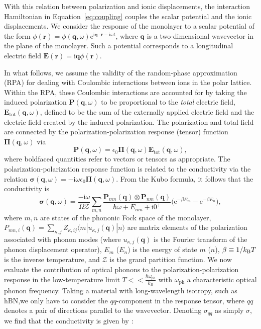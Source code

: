 \documentclass[aps,prb,twocolumn,
	           groupedaddress,superscriptaddress,
               amsfonts,amssymb,amsmath,floatfix,
	           citeautoscript]{revtex4-1}
\newcommand{\iu}{\mathrm{i}}
\newcommand{\e}{\mathrm{e}}
\begin{document}
With this relation between polarization and ionic displacements, the interaction Hamiltonian in Equation~\eqref{eq:coupling} couples the scalar potential and the ionic displacements.  We consider the response of the monolayer to a scalar potential of the form $\phi(\mathbf{r}) = \phi(\mathbf{q},\omega)\e^{\iu\mathbf{q}\cdot\mathbf{r}-\iu\omega t}$, where $\mathbf{q}$ is a two-dimensional wavevector in the plane of the monolayer. Such a potential corresponds to a longitudinal electric field  $\mathbf{E}(\mathbf{r}) = \iu\mathbf{q}\phi(\mathbf{r})$. 

In what follows, we assume the validity of the random-phase approximation (RPA) for dealing with Coulombic interactions between ions in the polar lattice. Within the RPA, these Coulombic interactions are accounted for by taking the induced polarization $\mathbf{P}(\mathbf{q},\omega)$ to be proportional to the \emph{total} electric field, $\mathbf{E}_{\mathrm{tot}}(\mathbf{q},\omega)$, defined to be the sum of the externally applied electric field and the electric field created by the induced polarization. The polarization and total-field are connected by the polarization-polarization response (tensor) function  $\boldsymbol{\Pi}(\mathbf{q},\omega)$ via
\begin{equation}
\mathbf{P}(\mathbf{q},\omega)  = \epsilon_0\boldsymbol{\Pi}(\mathbf{q},\omega)\mathbf{E}_{\mathrm{tot}}(\mathbf{q},\omega),
\end{equation}
where boldfaced quantities refer to vectors or tensors as appropriate. The polarization-polarization response function is related to the conductivity via the relation $\boldsymbol{\sigma}(\mathbf{q},\omega) = -\iu\omega\epsilon_0\boldsymbol{\Pi}(\mathbf{q},\omega)$. From the Kubo formula, it follows that the conductivity is
\begin{equation}\label{eq:2dsusceptibility}
    \boldsymbol{\sigma}(\mathbf{q},\omega) =  \frac{-\iu \omega}{ \Omega\mathcal{Z}}\sum\limits_{m,n}\frac{\mathbf{P}_{mn}(\mathbf{q})\otimes\mathbf{P}_{nm}(\mathbf{q})}{\hbar\omega + E_{nm}+\iu 0^+}\Big(\e^{-\beta E_m}-\e^{-\beta E_n} \Big),
\end{equation}
where $m,n$ are states of the phononic Fock space of the monolayer, $P_{mn,i}(\mathbf{q}) = \sum_{\kappa,j}Z_{\kappa,ij}\langle m | u_{\kappa,j}(\mathbf{q}) | n \rangle$ are matrix elements of the polarization associated with phonon modes (where $u_{\kappa,j}(\mathbf{q})$ is the Fourier transform of the phonon displacement operator), $E_{m}$ ($E_n$) is the energy of state $m$ ($n$), $\beta \equiv 1/k_{\text{\textsc{B}}}T$ is the inverse temperature, and $\mathcal{Z}$ is the grand partition function. We now evaluate the contribution of optical phonons to the polarization-polarization response in the low-temperature limit $T << \frac{\hbar\omega_{\mathrm{ph}}}{k_B}$ with $\omega_{\mathrm{ph}}$ a characteristic optical phonon frequency.  Taking a material with long-wavelength isotropy, such as hBN,we only have to consider the $qq$-component in the response tensor, where $qq$ denotes a pair of directions parallel to the wavevector. Denoting $\sigma_{qq}$ as simply $\sigma$, we find that the conductivity is given by \cite{rivera2018ab}: 
\end{document}
